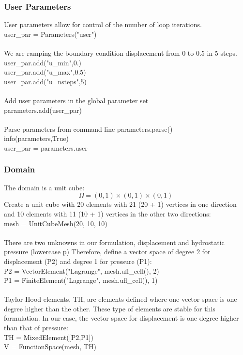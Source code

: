 \documentclass[12pt,3p]{article}
\begin{document}
\subsubsection{User Parameters}
User parameters allow for control of the number of loop iterations.   \\
{\selectfont
user\_par = Parameters("user") \\ \\
}
We are ramping the boundary condition displacement from 0 to 0.5 in 5 steps. \\
{\selectfont
user\_par.add("u\_min",0.) \\
user\_par.add("u\_max",0.5) \\
user\_par.add("u\_nsteps",5) \\ \\ 
}
Add user parameters in the global parameter set \\
{\selectfont
parameters.add(user\_par) \\ \\
}
Parse parameters from command line
{\selectfont
parameters.parse() \\
info(parameters,True) \\
user\_par = parameters.user 
}

\subsubsection{Domain}
The domain is a unit cube: 
\[ \Omega = (0,1) \times (0,1) \times (0,1)\] 
Create a unit cube with 20 elements with 21 (20 + 1) vertices in one direction and 10 elements with 11 (10 + 1) vertices in the other two directions: \\
{\selectfont
mesh = UnitCubeMesh(20, 10, 10) \\ \\
}
There are two unknowns in our formulation, displacement and hydrostatic pressure (lowercase p) Therefore, define a vector space of degree 2 for displacement (P2) and degree 1 for pressure (P1): \\
{\selectfont
P2 = VectorElement("Lagrange", mesh.ufl\_cell(), 2) \\
P1 = FiniteElement("Lagrange", mesh.ufl\_cell(), 1) \\ \\
}
Taylor-Hood elements, {\selectfont TH}, are elements defined where one vector space is one degree higher than the other. These type of elements are stable for this formulation. In our case, the vector space for displacement is one degree higher than that of pressure: \\ 
{\selectfont
TH = MixedElement([P2,P1]) \\
V  = FunctionSpace(mesh, TH) 
}
\end{document}
